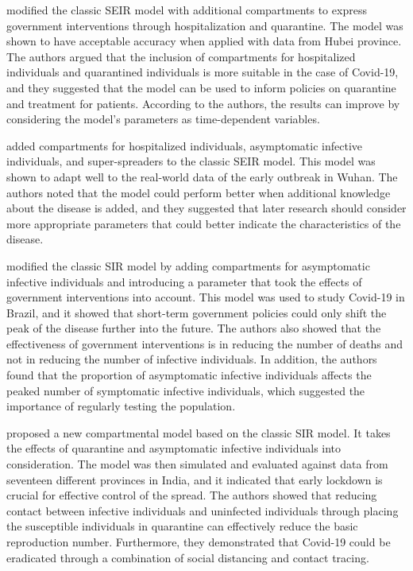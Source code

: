 \citeauthor{heSEIRModelingCOVID192020} \cite{heSEIRModelingCOVID192020} modified the classic \gls{SEIR} model with additional compartments to express government interventions through hospitalization and quarantine.
The model was shown to have acceptable accuracy when applied with data from Hubei province.
The authors argued that the inclusion of compartments for hospitalized individuals and quarantined individuals is more suitable in the case of Covid-19, and they suggested that the model can be used to inform policies on quarantine and treatment for patients.
According to the authors, the results can improve by considering the model's parameters as time-dependent variables.

\citeauthor{ndairouMathematicalModelingCOVID192020} \cite{ndairouMathematicalModelingCOVID192020} added compartments for hospitalized individuals, asymptomatic infective individuals, and super-spreaders to the classic \gls{SEIR} model.
This model was shown to adapt well to the real-world data of the early outbreak in Wuhan.
The authors noted that the model could perform better when additional knowledge about the disease is added, and they suggested that later research should consider more appropriate parameters that could better indicate the characteristics of the disease.

\citeauthor{bastosModelingForecastingEarly2020} \cite{bastosModelingForecastingEarly2020} modified the classic \gls{SIR} model by adding compartments for asymptomatic infective individuals and introducing a parameter that took the effects of government interventions into account.
This model was used to study Covid-19 in Brazil, and it showed that short-term government policies could only shift the peak of the disease further into the future.
The authors also showed that the effectiveness of government interventions is in reducing the number of deaths and not in reducing the number of infective individuals.
In addition, the authors found that the proportion of asymptomatic infective individuals affects the peaked number of symptomatic infective individuals, which suggested the importance of regularly testing the population.

\citeauthor{sarkarModelingForecastingCOVID192020} \cite{sarkarModelingForecastingCOVID192020} proposed a new compartmental model based on the classic \gls{SIR} model.
It takes the effects of quarantine and asymptomatic infective individuals into consideration.
The model was then simulated and evaluated against data from seventeen different provinces in India, and it indicated that early lockdown is crucial for effective control of the spread.
The authors showed that reducing contact between infective individuals and uninfected individuals through placing the susceptible individuals in quarantine can effectively reduce the basic reproduction number.
Furthermore, they demonstrated that Covid-19 could be eradicated through a combination of social distancing and contact tracing.

